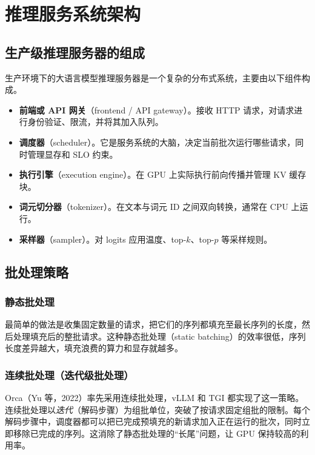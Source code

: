 \chapter{推理服务系统架构}

\section{生产级推理服务器的组成}

生产环境下的大语言模型推理服务器是一个复杂的分布式系统，主要由以下组件构成。
\begin{itemize}
  \item \textbf{前端或 API 网关}（frontend / API gateway）。接收 HTTP 请求，对请求进行身份验证、限流，并将其加入队列。
  \item \textbf{调度器}（scheduler）。它是服务系统的大脑，决定当前批次运行哪些请求，同时管理显存和 SLO 约束。
  \item \textbf{执行引擎}（execution engine）。在 GPU 上实际执行前向传播并管理 KV 缓存块。
  \item \textbf{词元切分器}（tokenizer）。在文本与词元 ID 之间双向转换，通常在 CPU 上运行。
  \item \textbf{采样器}（sampler）。对 logits 应用温度、top-\(k\)、top-\(p\) 等采样规则。
\end{itemize}

\section{批处理策略}

\subsection{静态批处理}

最简单的做法是收集固定数量的请求，把它们的序列都填充至最长序列的长度，然后处理填充后的整批请求。这种静态批处理（static batching）的效率很低，序列长度差异越大，填充浪费的算力和显存就越多。

\subsection{连续批处理（迭代级批处理）}

Orca（Yu 等，2022）率先采用连续批处理，vLLM 和 TGI 都实现了这一策略。连续批处理以\emph{迭代}（解码步骤）为组批单位，突破了按请求固定组批的限制。每个解码步骤中，调度器都可以把已完成预填充的新请求加入正在运行的批次，同时立即移除已完成的序列。这消除了静态批处理的“长尾”问题，让 GPU 保持较高的利用率。

